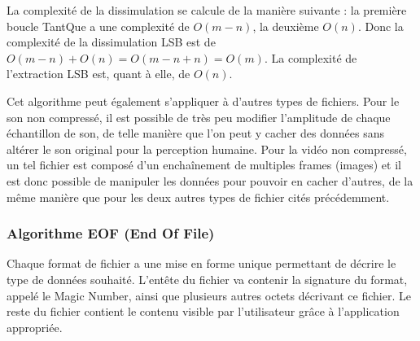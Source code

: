 \documentclass[11pt]{article}
\begin{document}


La complexité de la dissimulation se calcule de la manière suivante : 
la première boucle TantQue a une complexité de $O(m-n)$, la deuxième $O(n)$. 
\newline Donc la complexité de la dissimulation LSB est de $O(m-n)+O(n)=O(m-n+n)=O(m)$. 
\newline La complexité de l'extraction LSB est, quant à elle, de $O(n)$.

Cet algorithme peut également s'appliquer à d'autres types de fichiers. Pour le
son non compressé, il est possible de très peu modifier l'amplitude de chaque
échantillon de son, de telle manière que l'on peut y cacher des données sans
altérer le son original pour la perception humaine. Pour la vidéo non compressé,
un tel fichier est composé d'un enchaînement de multiples frames (images) et il
est donc possible de manipuler les données pour pouvoir en cacher d'autres, de
la même manière que pour les deux autres types de fichier cités précédemment.


\subsubsection{Algorithme EOF (End Of File)}

Chaque format de fichier a une mise en forme unique permettant de décrire le
type de données souhaité. L'entête du fichier va contenir la signature du
format, appelé le Magic Number, ainsi que plusieurs autres octets décrivant ce
fichier. Le reste du fichier contient le contenu visible par l'utilisateur grâce
à l'application appropriée. 
\end{document}
